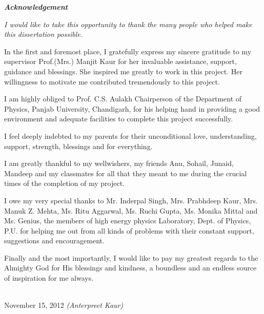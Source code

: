 \thispagestyle{empty}
\begin{center}
{\large \bf{\em Acknowledgement}}
\end{center}
\vspace*{0.5cm}
{ \em
I would like to take this opportunity to thank the many people who helped make this dissertation possible.

In the first and foremost place, I gratefully express my sincere gratitude to my supervisor Prof.(Mrs.) Manjit Kaur for her invaluable assistance, support, guidance and blessings. She inspired me greatly to work in this project. Her willingness to motivate me contributed tremendously to this project. 

I am highly obliged to Prof. C.S. Aulakh Chairperson of the Department of Physics, Panjab University, Chandigarh, for his helping hand in providing a good environment and adequate facilities to complete this project successfully.

I feel deeply indebted to my parents for their unconditional love, understanding, support, strength, blessings and for everything.

I am greatly thankful to my wellwishers, my friends Anu, Sohail, Junaid, Mandeep and my classmates for all that they meant to me during the crucial times of the completion of my project.

I owe my very special thanks to Mr. Inderpal Singh, Mrs. Prabhdeep Kaur, Mrs. Manuk Z. Mehta, Ms. Ritu Aggarwal, Ms. Ruchi Gupta, Ms. Monika Mittal and Ms. Genius, the members of high energy physics Laboratory, Dept. of Physics, P.U. for helping me out from all kinds of problems with their constant support, suggestions and encouragement. 

Finally and the most importantly, I would like to pay my greatest regards to the Almighty God for His blessings and kindness, a boundless and an endless source of inspiration for me always.} \\[2cm]
{November 15, 2012} \hspace*{8.cm}
{\em (Anterpreet Kaur)}
